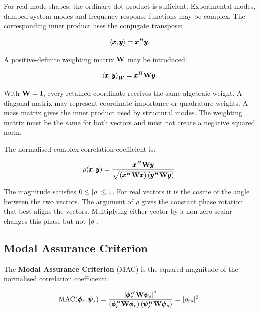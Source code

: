 For real mode shapes, the ordinary dot product is sufficient. Experimental
modes, damped-system modes and frequency-response functions may be complex. The
corresponding inner product uses the conjugate transpose:

\begin{equation}
    \left<\pmb{x},\pmb{y}\right>
    = \pmb{x}^{H}\pmb{y}.
\end{equation}

A positive-definite weighting matrix $ \mathbf{W} $ may be introduced:

\begin{equation}\label{weighted-inner-product-correlation}
    \left<\pmb{x},\pmb{y}\right>_{W}
    = \pmb{x}^{H}\mathbf{W}\pmb{y}.
\end{equation}

With $ \mathbf{W}=\mathbf{I} $, every retained coordinate receives the same algebraic
weight. A diagonal matrix may represent coordinate importance or quadrature
weights. A mass matrix gives the inner product used by structural modes. The
weighting matrix must be the same for both vectors and must not create a
negative squared norm.

The normalised complex correlation coefficient is:

\begin{bbox}
    \begin{equation}\label{normalised-complex-correlation}
        \rho(\pmb{x},\pmb{y}) =
        \frac{\pmb{x}^{H}\mathbf{W}\pmb{y}}
        {\sqrt{\left(\pmb{x}^{H}\mathbf{W}\pmb{x}\right)
               \left(\pmb{y}^{H}\mathbf{W}\pmb{y}\right)}}.
    \end{equation}
\end{bbox}

The magnitude satisfies $0\leq| {\rho} |\leq1$. For real vectors it is the
cosine of the angle between the two vectors. The argument of $\rho$ gives the
constant phase rotation that best aligns the vectors. Multiplying either vector
by a non-zero scalar changes this phase but not $| {\rho} |$.

\subsection{Modal Assurance Criterion}

The \textbf{Modal Assurance Criterion} (MAC) is the squared magnitude of the
normalised correlation coefficient:

\begin{bbox}
    \begin{equation}\label{mac-definition}
        \operatorname{MAC}(\pmb{\phi}_r,\pmb{\psi}_s)
        =
        \frac{
            | {\pmb{\phi}_r^{H}\mathbf{W}\pmb{\psi}_s} |^{2}
        }{
            \left(\pmb{\phi}_r^{H}\mathbf{W}\pmb{\phi}_r\right)
            \left(\pmb{\psi}_s^{H}\mathbf{W}\pmb{\psi}_s\right)
        }
        = | {\rho_{rs}} |^2.
    \end{equation}
\end{bbox}


